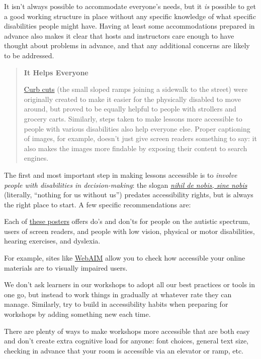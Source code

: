It isn't always possible to accommodate everyone's needs, but it \emph{is}
possible to get a good working structure in place without any specific
knowledge of what specific disabilities people might have. Having at
least some accommodations prepared in advance also makes it clear that
hosts and instructors care enough to have thought about problems in
advance, and that any additional concerns are likely to be addressed.

\begin{quote}\setlength{\parindent}{0pt}
\textbf{It Helps Everyone}

\href{https://en.wikipedia.org/wiki/Curb\_cut}{Curb cuts} (the small sloped ramps joining a sidewalk to
the street) were originally created to make it easier for the
physically disabled to move around, but proved to be equally helpful
to people with strollers and grocery carts. Similarly, steps taken
to make lessons more accessible to people with various disabilities
also help everyone else. Proper captioning of images, for example,
doesn't just give screen readers something to say: it also makes the
images more findable by exposing their content to search engines.
\end{quote}

The first and most important step in making lessons accessible is to
\emph{involve people with disabilities in decision-making}: the slogan
\emph{\href{https://en.wikipedia.org/wiki/Nothing\_About\_Us\_Without\_Us}{nihil de nobis, sine nobis}} (literally, ``nothing
for us without us'') predates accessibility rights, but is always the
right place to start. A few specific recommendations are:

\begin{description}
\tightlist
\item[Find out what you need to do.]
Each of \href{https://accessibility.blog.gov.uk/2016/09/02/dos-and-donts-on-designing-for-accessibility/}{these posters} offers do's and
don'ts for people on the autistic spectrum, users of screen readers,
and people with low vision, physical or motor disabilities, hearing
exercises, and dyslexia.
\item[Know how well you're doing.]
For example, sites like \href{http://webaim.org/}{WebAIM} allow you to check how
accessible your online materials are to visually impaired users.
\item[Don't do everything at once.]
We don't ask learners in our workshops to adopt all our best
practices or tools in one go, but instead to work things in
gradually at whatever rate they can manage. Similarly, try to build
in accessibility habits when preparing for workshops by adding
something new each time.
\item[Do the easy things first.]
There are plenty of ways to make workshops more accessible that are
both easy and don't create extra cognitive load for anyone: font
choices, general text size, checking in advance that your room is
accessible via an elevator or ramp, etc.
\end{description}

